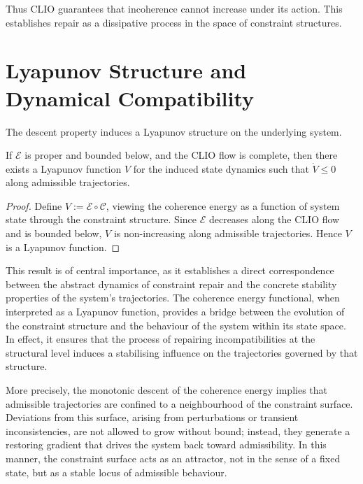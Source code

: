\documentclass[11pt,openany]{book}
\begin{document}
Thus CLIO guarantees that incoherence cannot increase under
its action.  This establishes repair as a dissipative
process in the space of constraint structures.

\section{Lyapunov Structure and Dynamical Compatibility}
\label{sec:lyapunov}

The descent property induces a Lyapunov structure on the
underlying system.

\begin{proposition}
\label{prop:clio-lyapunov}
If $\mathcal{E}$ is proper and bounded below, and the CLIO
flow is complete, then there exists a Lyapunov function $V$
for the induced state dynamics such that $\dot{V} \le 0$
along admissible trajectories.
\end{proposition}

\begin{proof}
Define $V := \mathcal{E} \circ \mathcal{C}$, viewing the
coherence energy as a function of system state through the
constraint structure.  Since $\mathcal{E}$ decreases along
the CLIO flow and is bounded below, $V$ is non-increasing
along admissible trajectories.  Hence $V$ is a Lyapunov
function.
\end{proof}

This result is of central importance, as it establishes a
direct correspondence between the abstract dynamics of
constraint repair and the concrete stability properties of
the system’s trajectories.  The coherence energy functional,
when interpreted as a Lyapunov function, provides a bridge
between the evolution of the constraint structure and the
behaviour of the system within its state space.  In effect,
it ensures that the process of repairing incompatibilities
at the structural level induces a stabilising influence on
the trajectories governed by that structure.

More precisely, the monotonic descent of the coherence
energy implies that admissible trajectories are confined to
a neighbourhood of the constraint surface.  Deviations from
this surface, arising from perturbations or transient
inconsistencies, are not allowed to grow without bound;
instead, they generate a restoring gradient that drives the
system back toward admissibility.  In this manner, the
constraint surface acts as an attractor, not in the sense of
a fixed state, but as a stable locus of admissible
behaviour.
\end{document}
